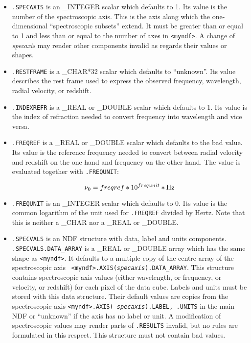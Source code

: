 \begin{itemize}

\item{\tt .SPECAXIS} is an \_INTEGER scalar which defaults to 1. Its
   value is the number of the spectroscopic axis. This is the axis along
   which the one-dimensional ``spectroscopic subsets'' extend. It must
   be greater than or equal to 1 and less than or equal to the number of
   axes in {\tt <myndf>}. A change of {\it specaxis} may render other
   components invalid as regards their values or shapes.

\item{\tt .RESTFRAME} is a \_CHAR*32 scalar which defaults to
   ``unknown''.  Its value describes the rest frame used to express the
   observed frequency, wavelength, radial velocity, or redshift.

\item{\tt .INDEXREFR} is a \_REAL or \_DOUBLE scalar which defaults to
   1. Its value is the index of refraction needed to convert frequency
   into wavelength and vice versa.

\item{\tt .FREQREF} is a \_REAL or \_DOUBLE scalar which defaults to the
   bad value. Its value is the reference frequency needed to convert
   between radial velocity and redshift on the one hand and frequency on
   the other hand. The value is evaluated together with {\tt .FREQUNIT}:

   \[\nu_0=freqref*10^{frequnit}*{\rm Hz}\]

\item{\tt .FREQUNIT} is an \_INTEGER scalar which defaults to 0. Its
   value is the common logarithm of the unit used for {\tt .FREQREF}
   divided by Hertz. Note that this is neither a \_CHAR nor a \_REAL or
   \_DOUBLE.

\item{\tt .SPECVALS} is an NDF structure with data, label and units
   components. {\tt .SPECVALS.\-DATA\_\-ARRAY} is a \_REAL or \_DOUBLE
   array which has the same shape as {\tt <myndf>}. It defaults to a
   multiple copy of the centre array of the spectroscopic axis {\tt
   <myndf>.AXIS\-({\it specaxis})\-.DATA\_\-ARRAY}. This structure
   contains spectroscopic axis values (either wavelength, or frequency,
   or velocity, or redshift) for each pixel of the data cube. Labels and
   units must be stored with this data structure. Their default values
   are copies from the spectroscopic axis {\tt <myndf>.AXIS({\it
   specaxis}).LABEL, .UNITS} in the main NDF or ``unknown'' if the axis
   has no label or unit. A modification of spectroscopic values may
   render parts of {\tt .RESULTS} invalid, but no rules are formulated
   in this respect. This structure must not contain bad values.


\end{itemize}
